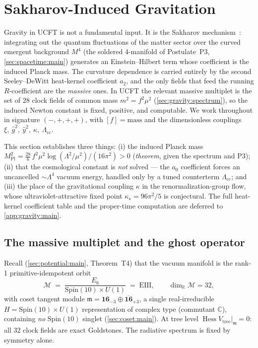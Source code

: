 \documentclass[11pt]{article}
\theoremstyle{plain}
\theoremstyle{definition}
\theoremstyle{remark}
\newcommand{\Hess}{\operatorname{Hess}}
\begin{document}
\section{Sakharov-Induced Gravitation}
\label{sec:gravity:main}

Gravity in UCFT is not a fundamental input. It is the Sakharov
mechanism~\cite{Sakharov:1967pk}: integrating out the quantum
fluctuations of the matter sector over the curved emergent background
$M^{4}$ (the soldered 4-manifold of Postulate~P3, \autoref{sec:spacetime:main})
generates an Einstein--Hilbert term whose coefficient is the induced
Planck mass. The curvature dependence is carried entirely by the
second Seeley--DeWitt heat-kernel coefficient $a_{2}$, and the only
fields that feed the running $R$-coefficient are the \emph{massive}
ones. In UCFT the relevant massive multiplet is the set of
$28$ clock fields of common mass $m^{2}=f^{2}\mu^{2}$
(\autoref{sec:gravity:spectrum}), so the induced Newton constant is
fixed, positive, and computable. We work throughout in signature
$(-,+,+,+)$, with $[f]=\text{mass}$ and the dimensionless couplings
$\xi,\ \hat g^{2},\ \hat y^{2},\ \kappa,\ \Lambda_{\mathrm{cc}}$.

This section establishes three things: (i) the induced Planck mass
$M_{\mathrm{Pl}}^{2}=\tfrac{28}{6}\,f^{2}\mu^{2}\log(\Lambda^{2}/\mu^{2})/(16\pi^{2})>0$
(\emph{theorem}, given the spectrum and P3); (ii) that the
cosmological constant is \emph{not} solved --- the $a_{0}$ coefficient
forces an uncancelled $\sim\Lambda^{4}$ vacuum energy, handled only by a
tuned counterterm $\Lambda_{\mathrm{cc}}$; and (iii) the place of the
gravitational coupling $\kappa$ in the renormalization-group flow, whose
ultraviolet-attractive fixed point $\kappa_{\star}=96\pi^{2}/5$ is
conjectural. The full heat-kernel coefficient table and the
proper-time computation are deferred to \autoref{app:gravity:main}.

\subsection{The massive multiplet and the ghost operator}
\label{sec:gravity:spectrum}

Recall (\autoref{sec:potential:main}, Theorem~T4) that the vacuum manifold
is the rank-1 primitive-idempotent orbit
\[
  \mathcal M \;=\; \frac{E_{6}}{\mathrm{Spin}(10)\times U(1)} \;=\; \mathrm{EIII},
  \qquad \dim_{\mathbb R}\mathcal M = 32,
\]
with coset tangent module
$\mathfrak m = \mathbf{16}_{-3}\oplus\overline{\mathbf{16}}_{+3}$, a single
real-irreducible $H=\mathrm{Spin}(10)\times U(1)$ representation of complex
type (commutant $\mathbb C$), containing \emph{no} $\mathrm{Spin}(10)$
singlet (\autoref{sec:coset:main}). At tree level
$\Hess V_{\mathrm{tree}}|_{\mathfrak m}=0$: all $32$ clock fields are exact
Goldstones. The radiative spectrum is fixed by symmetry alone.
\end{document}
